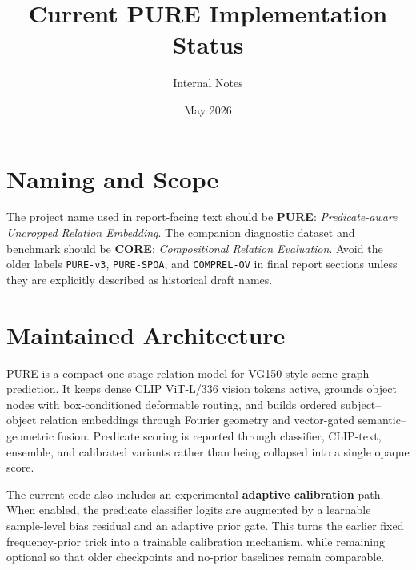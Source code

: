 \documentclass[11pt]{article}
\title{Current PURE Implementation Status}
\author{Internal Notes}
\date{May 2026}
\begin{document}
\maketitle

\section{Naming and Scope}
The project name used in report-facing text should be \textbf{PURE}: \emph{Predicate-aware Uncropped Relation Embedding}. The companion diagnostic dataset and benchmark should be \textbf{CORE}: \emph{Compositional Relation Evaluation}. Avoid the older labels \texttt{PURE-v3}, \texttt{PURE-SPOA}, and \texttt{COMPREL-OV} in final report sections unless they are explicitly described as historical draft names.

\section{Maintained Architecture}
PURE is a compact one-stage relation model for VG150-style scene graph prediction. It keeps dense CLIP ViT-L/336 vision tokens active, grounds object nodes with box-conditioned deformable routing, and builds ordered subject--object relation embeddings through Fourier geometry and vector-gated semantic--geometric fusion. Predicate scoring is reported through classifier, CLIP-text, ensemble, and calibrated variants rather than being collapsed into a single opaque score.

The current code also includes an experimental \textbf{adaptive calibration} path. When enabled, the predicate classifier logits are augmented by a learnable sample-level bias residual and an adaptive prior gate. This turns the earlier fixed frequency-prior trick into a trainable calibration mechanism, while remaining optional so that older checkpoints and no-prior baselines remain comparable.
\end{document}
